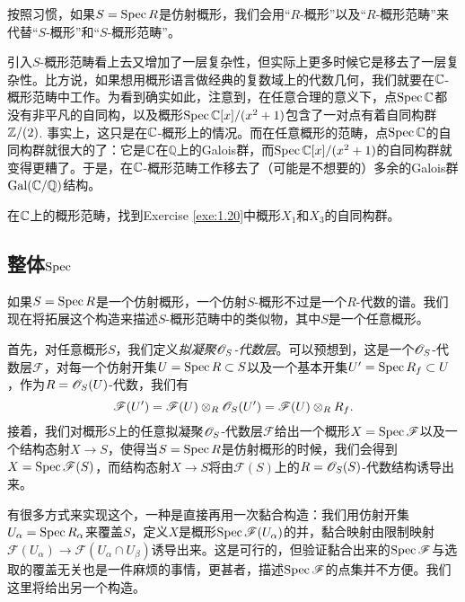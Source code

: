 按照习惯，如果$S=\operatorname{Spec} R$是仿射概形，我们会用“$R$-概形”以及“$R$-概形范畴”来代替“$S$-概形”和“$S$-概形范畴”。

引入$S$-概形范畴看上去又增加了一层复杂性，但实际上更多时候它是移去了一层复杂性。比方说，如果想用概形语言做经典的复数域上的代数几何，我们就要在$\mathbb{C}$-概形范畴中工作。为看到确实如此，注意到，在任意合理的意义下，点$\operatorname{Spec} \mathbb{C}$都没有非平凡的自同构，以及概形$\operatorname{Spec} \mathbb{C}[x]/(x^2+1)$包含了一对点有着自同构群$\mathbb{Z}/(2)$. 事实上，这只是在$\mathbb{C}$-概形上的情况。而在任意概形的范畴，点$\operatorname{Spec} \mathbb{C}$的自同构群就很大的了：它是$\mathbb{C}$在$\mathbb Q$上的Galois群，而$\operatorname{Spec} \mathbb{C}[x]/(x^2+1)$的自同构群就变得更糟了。于是，在$\mathbb{C}$-概形范畴工作移去了（可能是不想要的）多余的Galois群$\mathrm{Gal}(\mathbb{C}/\mathbb Q)$结构。

\begin{exe}\label{exe:1.50}
在$\mathbb{C}$上的概形范畴，找到Exercise \ref{exe:1.20}中概形$X_1$和$X_3$的自同构群。
\end{exe}

\subsection{整体\texorpdfstring{$\operatorname{Spec}$}{Spec}} \label{s:1.3.3}

如果$S=\operatorname{Spec} R$是一个仿射概形，一个仿射$S$-概形不过是一个$R$-代数的谱。我们现在将拓展这个构造来描述$S$-概形范畴中的类似物，其中$S$是一个任意概形。

首先，对任意概形$S$，我们定义\textit{拟凝聚$\mathscr{O}_S$-代数层}。可以预想到，这是一个$\mathscr{O}_S$-代数层$\mathscr F$，对每一个仿射开集$U=\operatorname{Spec} R\subset S$以及一个基本开集$U'=\operatorname{Spec} R_f\subset U$，作为$R=\mathscr{O}_S(U)$-代数，我们有
\[
	\mathscr F(U')=\mathscr F(U)\otimes_R \mathscr{O}_S(U')=\mathscr F(U)\otimes_R R_f.
\]
接着，我们对概形$S$上的任意拟凝聚$\mathscr{O}_S$-代数层$\mathscr F$给出一个概形$X=\operatorname{Spec} \mathscr F$以及一个结构态射$X\to S$，使得当$S=\operatorname{Spec} R$是仿射概形的时候，我们会得到$X=\operatorname{Spec} \mathscr F(S)$，而结构态射$X\to S$将由$\mathscr F(S)$上的$R=\mathscr{O}_S(S)$-代数结构诱导出来。

有很多方式来实现这个，一种是直接再用一次黏合构造：我们用仿射开集$U_\alpha=\operatorname{Spec} R_\alpha$来覆盖$S$，定义$X$是概形$\operatorname{Spec} \mathscr F(U_\alpha)$的并，黏合映射由限制映射$\mathscr F(U_\alpha)\to \mathscr F(U_\alpha\cap U_\beta)$诱导出来。这是可行的，但验证黏合出来的$\operatorname{Spec} \mathscr F$与选取的覆盖无关也是一件麻烦的事情，更甚者，描述$\operatorname{Spec} \mathscr F$的点集并不方便。我们这里将给出另一个构造。

